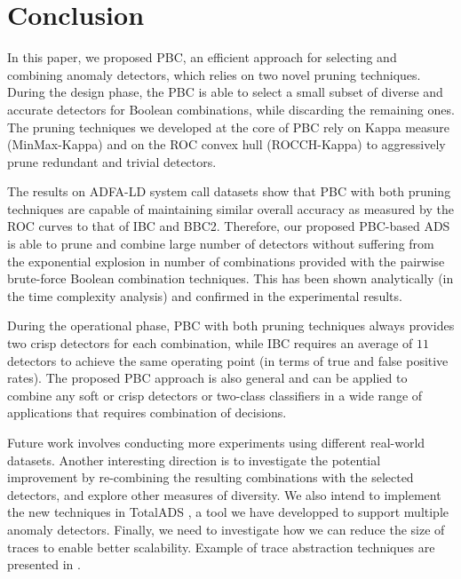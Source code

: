 \chapter{Conclusion} \label{chapter5}
In this paper, we proposed PBC, an efficient approach for selecting and combining anomaly detectors, which relies on two novel pruning techniques.
During the design phase, the PBC is able to select a small subset of diverse and accurate detectors for Boolean combinations, while discarding the remaining ones.
The pruning techniques we developed at the core of PBC rely on Kappa measure (MinMax-Kappa) and on the ROC convex hull (ROCCH-Kappa) to aggressively prune redundant and trivial detectors.

The results on ADFA-LD system call datasets show that PBC with both pruning techniques are capable of maintaining similar overall accuracy as measured by the ROC curves to that of IBC and BBC2.
Therefore, our proposed PBC-based ADS is able to prune and combine large number of detectors without suffering from the exponential explosion in number of combinations provided with the pairwise brute-force Boolean combination techniques.
This has been shown analytically (in the time complexity analysis) and confirmed in the experimental results.

During the operational phase, PBC with both pruning techniques always provides two crisp detectors for each combination, while IBC requires an average of $11$ detectors to achieve the same operating point (in terms of true and false positive rates).
The proposed PBC approach is also general and can be applied to combine any soft or crisp detectors or two-class classifiers in a wide range of applications that requires combination of decisions.

Future work involves conducting more experiments using different real-world datasets.
Another interesting direction is to investigate the potential improvement by re-combining the resulting combinations with the selected detectors, and explore other measures of diversity. We also intend to implement the new techniques in TotalADS \cite{Murtaza2014}, a tool we have developped to support multiple anomaly detectors. Finally, we need to investigate how we can reduce the size of traces to enable better scalability. Example of trace abstraction techniques are presented in \cite{Hamou-Lhadj2005,Murtaza2013}.